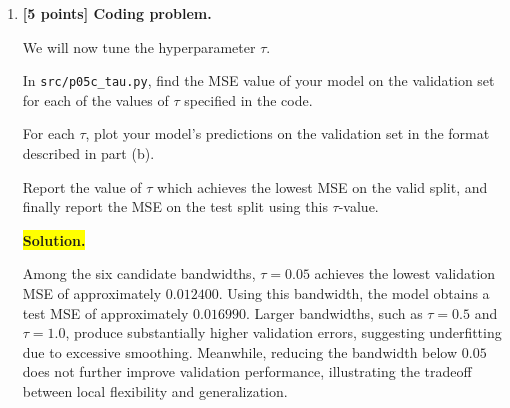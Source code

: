 \documentclass[10pt]{article}
\begin{document}
\begin{enumerate}
\begin{enumerate}[label=(\alph*)]

\medskip
\noindent\colorbox{yellow}{\textbf{Solution.}}
\vspace{3mm}

With \(\tau=0.5\), the locally weighted regression model achieves a validation MSE of approximately \(0.3305\).
 The predicted regression curve is relatively smooth while capturing several nonlinear trends in the training data.
 There is no obvious evidence of severe overfitting, although the plot alone is insufficient to determine whether the model is underfitting.
 Comparing validation errors across different bandwidths would provide a more reliable assessment.



\item \textbf{[5 points] Coding problem.}

We will now tune the hyperparameter $\tau$.

In \texttt{src/p05c\_tau.py}, find the MSE value of your model on the
validation set for each of the values of $\tau$ specified in the code.

For each $\tau$, plot your model's predictions on the validation set
in the format described in part (b).

Report the value of $\tau$ which achieves the lowest MSE on the valid
split, and finally report the MSE on the test split using this
$\tau$-value.


\medskip
\noindent\colorbox{yellow}{\textbf{Solution.}}
\vspace{3mm}

Among the six candidate bandwidths, \(\tau=0.05\) achieves the lowest validation MSE of approximately \(0.012400\). 
Using this bandwidth, the model obtains a test MSE of approximately \(0.016990\). 
Larger bandwidths, such as \(\tau=0.5\) and \(\tau=1.0\), produce substantially higher validation errors, suggesting underfitting due to excessive smoothing. 
Meanwhile, reducing the bandwidth below \(0.05\) does not further improve validation performance, illustrating the tradeoff between local flexibility and generalization.


\end{enumerate}

\end{enumerate}
\end{document}

